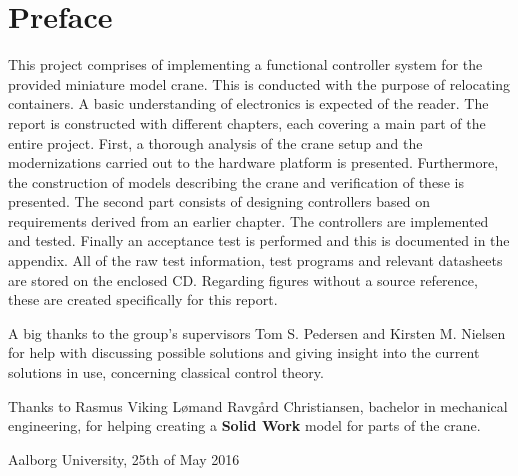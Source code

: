 \chapter*{Preface}

This project comprises of implementing a functional controller system for the provided miniature model crane. This is conducted with the purpose of relocating containers.  
A basic understanding of electronics is expected of the reader. 
The report is constructed with different chapters, each covering a main part of the entire project. 
First, a thorough analysis of the crane setup and the modernizations carried out to the hardware platform is presented. 
Furthermore, the construction of models describing the crane and verification of these is presented. 
The second part consists of designing controllers based on requirements derived from an
earlier chapter. The controllers are implemented and tested. Finally an acceptance test is performed and this is documented in the appendix. 
All of the raw test information, test programs and relevant datasheets are stored on the enclosed CD.
Regarding figures without a source reference, these are created specifically for this report.  

A big thanks to the group's supervisors Tom S. Pedersen and Kirsten M. Nielsen for help with discussing possible solutions and giving insight into the current solutions in use, concerning classical control theory. 

Thanks to Rasmus Viking Lømand Ravgård Christiansen, bachelor in mechanical engineering, for helping creating a \textbf{Solid Work} \cite{Solid_Work} model for parts of the crane. 

\begin{flushright}
Aalborg University, 25th of May 2016
\end{flushright}





\vfill

